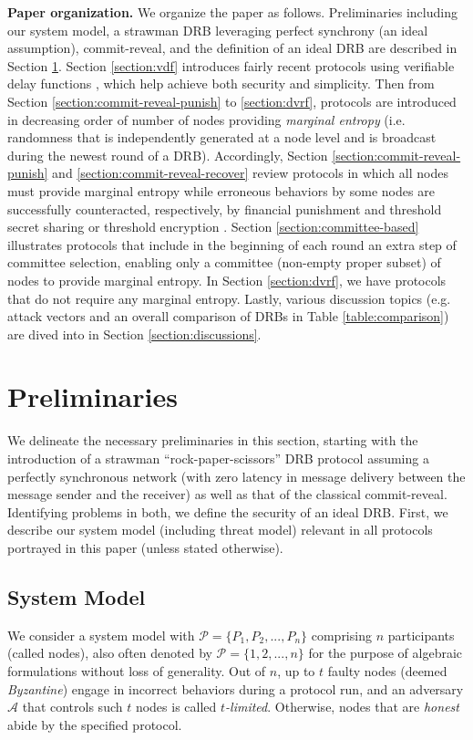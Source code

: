 \documentclass[letterpaper,twocolumn,10pt]{article}
\theoremstyle{definition}
\theoremstyle{remark}
\begin{document}
\textbf{Paper organization.} We organize the paper as follows. Preliminaries including our system model, a strawman DRB leveraging perfect synchrony (an ideal assumption), commit-reveal, and the definition of an ideal DRB are described in Section \ref{section:preliminaries}. Section \ref{section:vdf} introduces fairly recent protocols using verifiable delay functions \cite{boneh2018verifiable}, which help achieve both security and simplicity. Then from Section \ref{section:commit-reveal-punish} to \ref{section:dvrf}, protocols are introduced in decreasing order of number of nodes providing \textit{marginal entropy} (i.e. randomness that is independently generated at a node level and is broadcast during the newest round of a DRB). Accordingly, Section \ref{section:commit-reveal-punish} and \ref{section:commit-reveal-recover} review protocols in which all nodes must provide marginal entropy while erroneous behaviors by some nodes are successfully counteracted, respectively, by financial punishment \cite{youcai2017randao, david2020economically} and threshold secret sharing \cite{schoenmakers1999simple, cascudo2017scrape} or threshold encryption \cite{de1994share, desmedt1990Threshold}. Section \ref{section:committee-based} illustrates protocols that include in the beginning of each round an extra step of committee selection, enabling only a committee (non-empty proper subset) of nodes to provide marginal entropy. In Section \ref{section:dvrf}, we have protocols that do not require any marginal entropy. Lastly, various discussion topics (e.g. attack vectors and an overall comparison of DRBs in Table \ref{table:comparison}) are dived into in Section \ref{section:discussions}.

\section{Preliminaries}
\label{section:preliminaries}
We delineate the necessary preliminaries in this section, starting with the introduction of a strawman ``rock-paper-scissors'' DRB protocol assuming a perfectly synchronous network (with zero latency in message delivery between the message sender and the receiver) as well as that of the classical commit-reveal. Identifying problems in both, we define the security of an ideal DRB. First, we describe our system model (including threat model) relevant in all protocols portrayed in this paper (unless stated otherwise).

\subsection{System Model}
We consider a system model with $\mathcal{P} = \{P_1, P_2, ..., P_n\}$ comprising $n$ participants (called nodes), also often denoted by $\mathcal{P} = \{1, 2, ..., n\}$ for the purpose of algebraic formulations without loss of generality. Out of $n$, up to $t$ faulty nodes (deemed \textit{Byzantine}) engage in incorrect behaviors during a protocol run, and an adversary $\mathcal{A}$ that controls such $t$ nodes is called \textit{$t$-limited}. Otherwise, nodes that are \textit{honest} abide by the specified protocol.
\end{document}
